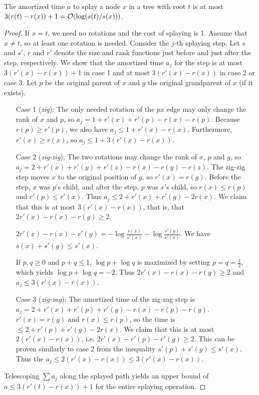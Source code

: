 \begin{lemma}
The amortized time $a$ to splay a node $x$ in a tree with root $t$
is at most $3(r(t)-r(x))+1 = \mathcal{O}(\log(s(t)/s(x)))$.
\end{lemma}
\begin{proof}
If $x=t$, we need no rotations and the cost of splaying is 1.
Assume that  $x\neq t$, so at least one rotation is needed.
Consider the $j$-th splaying step.
Let $s$ and $s'$, $r$ and $r'$ denote the size and rank functions just before
and just after the step, respectively. We show that the amortized time
$a_j$ for the step is at most $3(r'(x)-r(x))+1$ in case 1
and at most $3(r'(x)-r(x))$ in case 2 or case 3. Let $p$ be the original parent
of $x$ and $g$ the original grandparent of $x$ (if it exists).

\begin{itemize}
\item[Case 1 (\emph{zig}):]
	The only needed rotation of the $px$ edge may only change the rank of
	$x$ and $p$, so $a_j=1+r'(x)+r'(p)-r(x)-r(p)$.
	Because $r(p)\geq r'(p)$, we also have $a_j\leq 1+r'(x)-r(x)$.
	Furthermore, $r'(x)\geq r(x)$, so $a_j\leq 1+3(r'(x)-r(x))$.

\item[Case 2 (\emph{zig-zig}):]
	The two rotations may change the rank of $x$, $p$ and $g$,
	so $a_j=2+r'(x)+r'(y)+r'(z)-r(x)-r(y)-r(z)$. The zig-zig step
	moves $x$ to the original position of $g$, so $r'(x)=r(g)$.
	Before the step, $x$ was $p$'s child, and after the step,
	$p$ was $x$'s child, so $r(x)\leq r(p)$ and $r'(p)\leq r'(x)$.
	Thus $a_j\leq 2+r'(x)+r'(g)-2r(x)$.
	We claim that this is at most $3(r'(x)-r(x))$, that is, that
	$2r'(x)-r(x)-r(g)\geq 2$.

	$2r'(x)-r(x)-r'(g)=-\log\frac{s(x)}{s'(x)}-\log\frac{s'(g)}{s'(x)}$.
	We have $s(x)+s'(g)\leq s'(x)$.

	If $p,q\geq 0$ and $p+q\leq 1$, $\log p+\log q$ is maximized
	by setting $p=q=\frac{1}{2}$, which yields $\log p+\log q=-2$.
	Thus $2r'(x)-r(x)-r(g)\geq 2$ and $a_j \leq 3(r'(x)-r(x))$.

\item[Case 3 (\emph{zig-zag}):]
	The amortized time of the zig-zag step is
	$a_j=2+r'(x)+r'(p)+r'(g)-r(x)-r(p)-r(g)$. $r'(x)=r(g)$ and $r(x)\leq r(p)$,
	so the time is $\leq 2+r'(p)+r'(g)-2r(x)$.
	We claim that this is at most $2(r'(x)-r(x))$, i.e.
	$2r'(x)-r'(p)-r'(g)\geq 2$. This can be proven
	similarly to case 2 from the inequality $s'(p)+s'(g)\leq s'(x)$.
	Thus the $a_j \leq 2(r'(x)-r(x))\leq 3(r'(x)-r(x))$.
\end{itemize}

Telescoping $\sum a_j$ along the splayed path yields an upper bound of
$a \leq 3(r'(t)-r(x))+1$ for the entire splaying operation.
\end{proof}


